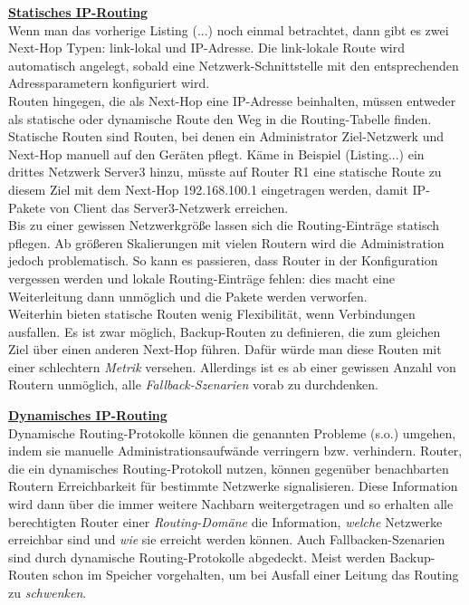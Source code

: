 \textbf{\underline{Statisches IP-Routing}}\\
Wenn man das vorherige Listing (...) noch einmal betrachtet, dann gibt es zwei Next-Hop Typen: link-lokal und \glqq IP-Adresse\grqq{}. Die link-lokale Route wird automatisch angelegt, sobald eine Netzwerk-Schnittstelle mit den entsprechenden Adressparametern konfiguriert wird.\\
Routen hingegen, die als Next-Hop eine IP-Adresse beinhalten, müssen entweder als statische oder dynamische Route den Weg in die Routing-Tabelle finden. Statische Routen sind Routen, bei denen ein Administrator Ziel-Netzwerk und Next-Hop manuell auf den Geräten pflegt. Käme in Beispiel (Listing...) ein drittes Netzwerk \glqq Server3\grqq{} hinzu, müsste auf Router R1 eine statische Route zu diesem Ziel mit dem Next-Hop 192.168.100.1 eingetragen werden, damit IP-Pakete von Client das Server3-Netzwerk erreichen.\\
Bis zu einer gewissen Netzwerkgröße lassen sich die Routing-Einträge statisch pflegen. Ab größeren Skalierungen mit vielen Routern wird die Administration jedoch problematisch. So kann es passieren, dass Router in der Konfiguration vergessen werden und lokale Routing-Einträge fehlen: dies macht eine Weiterleitung dann unmöglich und die Pakete werden verworfen.\\
Weiterhin bieten statische Routen wenig Flexibilität, wenn Verbindungen ausfallen. Es ist zwar möglich, Backup-Routen zu definieren, die zum gleichen Ziel über einen anderen Next-Hop führen. Dafür würde man diese Routen mit einer schlechtern \textit{Metrik} versehen. Allerdings ist es ab einer gewissen Anzahl von Routern unmöglich, alle \textit{Fallback-Szenarien} vorab zu durchdenken.

\textbf{\underline{Dynamisches IP-Routing}}\\
Dynamische Routing-Protokolle können die genannten Probleme (s.o.) umgehen, indem sie manuelle Administrationsaufwände verringern bzw. verhindern. Router, die ein dynamisches Routing-Protokoll nutzen, können gegenüber benachbarten Routern Erreichbarkeit für bestimmte Netzwerke signalisieren. Diese Information wird dann über die immer weitere Nachbarn weitergetragen und so erhalten alle berechtigten Router einer \textit{Routing-Domäne} die Information, \textit{welche} Netzwerke erreichbar sind und \textit{wie} sie erreicht werden können. Auch Fallbacken-Szenarien sind durch dynamische Routing-Protokolle abgedeckt. Meist werden Backup-Routen schon im Speicher vorgehalten, um bei Ausfall einer Leitung das Routing zu \textit{schwenken}.

